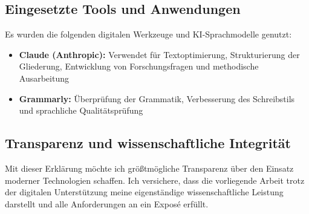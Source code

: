\documentclass[12pt,oneside,titlepage,listof=totoc,bibliography=totoc]{scrartcl}
\begin{document}
\subsection*{Eingesetzte Tools und Anwendungen}

Es wurden die folgenden digitalen Werkzeuge und KI-Sprachmodelle genutzt:

\begin{itemize}
  \item \textbf{Claude (Anthropic):} Verwendet f\"ur Textoptimierung, Strukturierung der Gliederung, Entwicklung von Forschungsfragen und methodische Ausarbeitung
  \item \textbf{Grammarly:} \"Uberpr\"ufung der Grammatik, Verbesserung des Schreibstils und sprachliche Qualit\"atspr\"ufung
\end{itemize}

\subsection*{Transparenz und wissenschaftliche Integrit\"at}

Mit dieser Erkl\"arung m\"ochte ich gr\"o\ss{}tm\"ogliche Transparenz \"uber den Einsatz moderner Technologien schaffen. Ich versichere, dass die vorliegende Arbeit trotz der digitalen Unterst\"utzung meine eigenst\"andige wissenschaftliche Leistung darstellt und alle Anforderungen an ein Expos\'e erf\"ullt.



\end{document}
